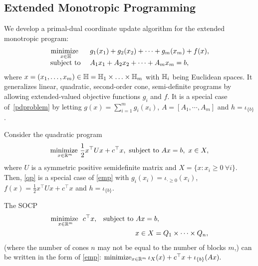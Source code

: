 {{\subsection{Extended Monotropic Programming}\label{sec:emp}
We develop a primal-dual coordinate update algorithm for the extended monotropic program:
\begin{equation}
\begin{array}{rl}
\underset{x\in\mathbb{H}}{\text{minimize  }} &~g_1(x_1)+g_2(x_2)+\cdots+g_m(x_m)+f(x),\\
\St &~A_1x_1+A_2x_2+\cdots+A_mx_m=b,
\end{array}\label{emp}
\end{equation}
where $x = (x_1, \ldots, x_m) \in \mathbb{H}=\mathbb{H}_1\times\ldots \times \mathbb{H}_m$ with $\mathbb{H}_i$ being Euclidean spaces. It generalizes linear, quadratic, second-order cone, semi-definite programs by allowing  extended-valued objective functions $g_i$ and $f$.
It is a special case of~\eqref{pdproblem} by letting $g(x)=\displaystyle\sum_{i=1}^m g_i(x_i)$, $A=[A_1,\cdots, A_m]$ and
$h=\iota_{\{b\}}$.
\begin{example}
Consider the quadratic program
\begin{equation}
\underset{x\in\mathbb{R}^m}{\textnormal{minimize }} \frac{1}{2}x^\top Ux+c^\top x,~\St~ Ax=b,~x\in X,\label{qp}
\end{equation}
where $U$ is a symmetric positive semidefinite matrix and $X=\{x:x_i \geq 0~\forall i\}$.
Then, \eqref{qp} is a special case of \eqref{emp}
with  $g_i(x_i)=\iota_{\cdot\geq 0}(x_i)$, $f(x)=\frac{1}{2}x^\top Ux+c^\top x$ and $h=\iota_{\{b\}}$.
\end{example}
\begin{example}
The SOCP
\begin{align*}
\underset{x\in\mathbb{R}^m}{\textnormal{minimize }} ~c^\top x,&\quad\St~ Ax=b,\\
&\hspace{56pt} x\in X=Q_1\times \cdots\times Q_{n},
\end{align*}
(where the number of cones $n$ may not be equal to the number of blocks $m$,) can be written in the form of \eqref{emp}: $\operatorname*{minimize}_{x\in\mathbb{R}^m} \iota_X(x)+c^\top x+\iota_{\{b\}}(Ax).$ %
\end{example}
}}
